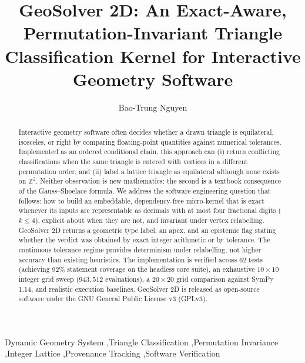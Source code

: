 \documentclass[preprint,12pt]{elsarticle}
\begin{document}
\begin{frontmatter}

\title{GeoSolver 2D: An Exact-Aware, Permutation-Invariant Triangle Classification Kernel for Interactive Geometry Software}

\author[1]{Bao-Trung Nguyen}
\address[1]{Independent Researcher, Ho Chi Minh City, Vietnam}

\begin{abstract}
Interactive geometry software often decides whether a drawn triangle is equilateral, isosceles, or right by comparing floating-point quantities against numerical tolerances. Implemented as an ordered conditional chain, this approach can (i) return conflicting classifications when the same triangle is entered with vertices in a different permutation order, and (ii) label a lattice triangle as equilateral although none exists on $\mathbb{Z}^2$. Neither observation is new mathematics: the second is a textbook consequence of the Gauss--Shoelace formula. We address the software engineering question that follows: how to build an embeddable, dependency-free micro-kernel that is exact whenever its inputs are representable as decimals with at most four fractional digits ($k \le 4$), explicit about when they are not, and invariant under vertex relabelling. GeoSolver 2D returns a geometric type label, an apex, and an epistemic flag stating whether the verdict was obtained by exact integer arithmetic or by tolerance. The continuous tolerance regime provides determinism under relabelling, not higher accuracy than existing heuristics. The implementation is verified across 62 tests (achieving 92\% statement coverage on the headless core suite), an exhaustive $10 \times 10$ integer grid sweep ($943{,}512$ evaluations), a $20 \times 20$ grid comparison against SymPy 1.14, and realistic execution baselines. GeoSolver 2D is released as open-source software under the GNU General Public License v3 (GPLv3).
\end{abstract}

\begin{keyword}
Dynamic Geometry System \sep Triangle Classification \sep Permutation Invariance \sep Integer Lattice \sep Provenance Tracking \sep Software Verification
\end{keyword}

\end{frontmatter}
\end{document}

